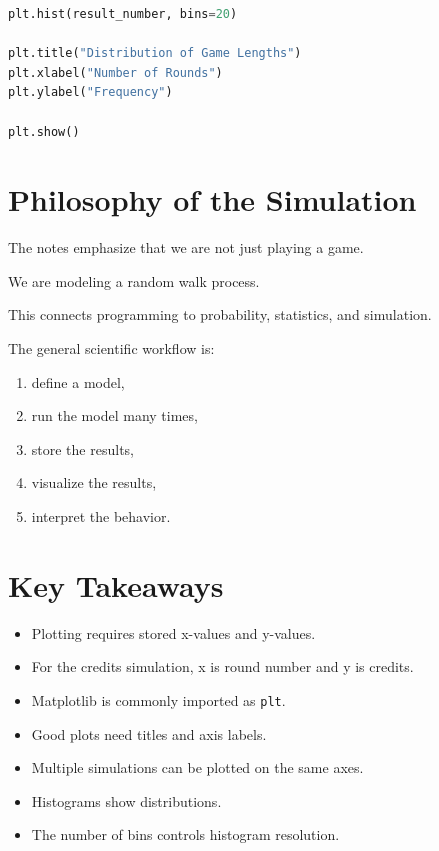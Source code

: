 \documentclass[11pt]{article}
\begin{document}
\begin{lstlisting}[language=Python]
plt.hist(result_number, bins=20)

plt.title("Distribution of Game Lengths")
plt.xlabel("Number of Rounds")
plt.ylabel("Frequency")

plt.show()
\end{lstlisting}

\section{Philosophy of the Simulation}

The notes emphasize that we are not just playing a game.

We are modeling a random walk process.

This connects programming to probability, statistics, and simulation.

The general scientific workflow is:

\begin{enumerate}
    \item define a model,
    \item run the model many times,
    \item store the results,
    \item visualize the results,
    \item interpret the behavior.
\end{enumerate}

\section{Key Takeaways}

\begin{itemize}
    \item Plotting requires stored x-values and y-values.
    \item For the credits simulation, x is round number and y is credits.
    \item Matplotlib is commonly imported as \verb|plt|.
    \item Good plots need titles and axis labels.
    \item Multiple simulations can be plotted on the same axes.
    \item Histograms show distributions.
    \item The number of bins controls histogram resolution.
\end{itemize}
\end{document}
